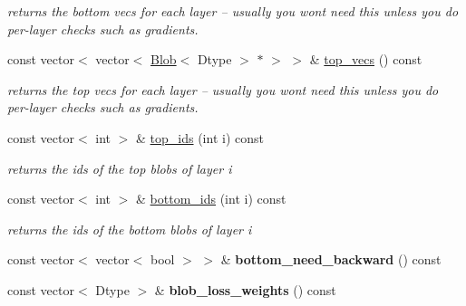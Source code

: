 \begin{DoxyCompactItemize}
\begin{DoxyCompactList}\small\item\em returns the bottom vecs for each layer -- usually you won\textquotesingle{}t need this unless you do per-\/layer checks such as gradients. \end{DoxyCompactList}\item 
\mbox{\label{classcaffe_1_1_net_ad9aace0b6b268d391101f0ce31be9fd1}} 
const vector$<$ vector$<$ \mbox{\hyperlink{classcaffe_1_1_blob}{Blob}}$<$ Dtype $>$ $\ast$ $>$ $>$ \& \mbox{\hyperlink{classcaffe_1_1_net_ad9aace0b6b268d391101f0ce31be9fd1}{top\+\_\+vecs}} () const
\begin{DoxyCompactList}\small\item\em returns the top vecs for each layer -- usually you won\textquotesingle{}t need this unless you do per-\/layer checks such as gradients. \end{DoxyCompactList}\item 
\mbox{\label{classcaffe_1_1_net_a8e42b5eba7886385d2d4b6f457314968}} 
const vector$<$ int $>$ \& \mbox{\hyperlink{classcaffe_1_1_net_a8e42b5eba7886385d2d4b6f457314968}{top\+\_\+ids}} (int i) const
\begin{DoxyCompactList}\small\item\em returns the ids of the top blobs of layer i \end{DoxyCompactList}\item 
\mbox{\label{classcaffe_1_1_net_a7ccd2bf8a1684171b7d7603cf20c0251}} 
const vector$<$ int $>$ \& \mbox{\hyperlink{classcaffe_1_1_net_a7ccd2bf8a1684171b7d7603cf20c0251}{bottom\+\_\+ids}} (int i) const
\begin{DoxyCompactList}\small\item\em returns the ids of the bottom blobs of layer i \end{DoxyCompactList}\item 
\mbox{\label{classcaffe_1_1_net_abe9a3629ee7436c85ea141e841d859f8}} 
const vector$<$ vector$<$ bool $>$ $>$ \& {\bfseries bottom\+\_\+need\+\_\+backward} () const
\item 
\mbox{\label{classcaffe_1_1_net_a4c18612b7683788a4b7f40265a7a38e0}} 
const vector$<$ Dtype $>$ \& {\bfseries blob\+\_\+loss\+\_\+weights} () const

\end{DoxyCompactItemize}
